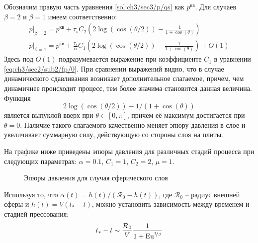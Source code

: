 Обозначим правую часть уравнения \cref{sol:ch3/sec3/p/qs} как $p^\text{кв}$. Для случаев $\beta=2$ и $\beta=1$ имеем соответственно:
\begin{gather}
  p\lvert_{\beta=2} = p^\text{кв} + \tau_{s} C_2 \left(2\log{\left(\cos{\left({\theta / 2}\right)}\right)} - \frac{1}{1+\cos{\left(\theta\right)}}\right)
  \\
  p\lvert_{\beta=1} = p^\text{кв} + \frac{\tau_{s}}{\alpha} C_1 \left(2\log{\left(\cos{\left({\theta / 2}\right)}\right)} - \frac{1}{1+\cos{\left(\theta\right)}}\right) + O(1)
\end{gather}
Здесь под $O(1)$ подразумевается выражение при коэффициенте $C_1$ в уравнении \cref{eq:ch3/sec2/sub2/fp/0}.
При сравнении выражений видно, что в случае динамического сдавливания возникает дополнительное слагаемое, причем, чем динамичнее происходит процесс, тем более значима становится данная величина. Функция
\begin{equation*}
  2\log{\left(\cos{\left({\theta / 2}\right)}\right)} - 1/\left(1+\cos{\left(\theta\right)}\right)
\end{equation*}
является выпуклой вверх при $\theta \in [0, \pi]$, причем её максимум достигается при $\theta=0$.
Наличие такого слагаемого качественно меняет эпюру давления в слое и увеличивает суммарную силу, действующую со стороны слоя на плиты.

На графике ниже приведены эпюры давления для различных стадий процесса при следующих параметрах: $\alpha=0.1$, $C_1=1$, $C_2=2$, $\mu=1$.
\begin{figure}[ht]
  \caption{Эпюры давления для случая сферического слоя}
  \label{fig:ch3/sec3/pressure}
\end{figure}

Используя то, что $\alpha(t) = h(t) / \left(\mathcal{R}_0 - h(t) \right)$, где $\mathcal{R}_0$ -- радиус внешней сферы и $h(t) = V(t_*-t)$, можно установить зависимость между временем и стадией прессования:
\begin{equation}
  t_* - t \sim \frac{\mathcal{R}_0}{V} \frac{1}{1+\text{Eu}^{\nicefrac{1}{\beta}}}
\end{equation}
